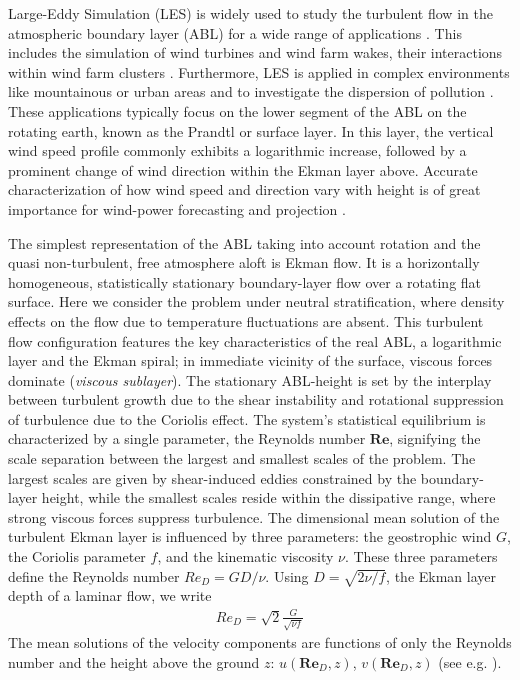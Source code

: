 \documentclass[smallcondensed,draft]{svjour3}
\newcommand{\RE}{\mathbf{Re}}
\begin{document}
Large-Eddy Simulation (LES) is widely used to study the turbulent flow in the atmospheric boundary layer (ABL) for a wide range of applications \citep{stoll2020large}. This includes the simulation of wind turbines and wind farm wakes, their interactions within wind farm clusters \citep{porte2011large,mehta2014large,breton2017survey}. Furthermore, LES is applied in complex environments like mountainous or urban areas \citep{stoll2020large,garcia2018predictive} and to investigate the dispersion of pollution \citep{han2018large}. These applications typically focus on the lower segment of the ABL on the rotating earth, known as the Prandtl or surface layer. In this layer, the vertical wind speed profile commonly exhibits a logarithmic increase, followed by a prominent change of wind direction within the Ekman layer above. Accurate characterization of how wind speed and direction vary with height is of great importance for wind-power forecasting and projection \citep{optis2014moving}.

The simplest representation of the ABL taking into account rotation and the quasi non-turbulent, free atmosphere aloft is Ekman flow. It is a horizontally homogeneous, statistically stationary boundary-layer flow over a rotating flat surface. Here we consider the problem under neutral stratification, where density effects on the flow due to temperature fluctuations are absent. This turbulent flow configuration features the key characteristics of the real ABL, a logarithmic layer and the Ekman spiral; in immediate vicinity of the surface, viscous forces dominate (\emph{viscous sublayer}). The stationary ABL-height is set by the interplay between turbulent growth due to the shear instability \citep{lilly1966instability} and rotational suppression of turbulence due to the Coriolis effect. The system's statistical equilibrium is characterized by a single parameter, the Reynolds number $\RE$, signifying the scale separation between the largest and smallest scales of the problem. The largest scales are given by shear-induced eddies constrained by the boundary-layer height, while the smallest scales reside within the dissipative range, where strong viscous forces suppress turbulence. The dimensional mean solution of the turbulent Ekman layer is influenced by three parameters: the geostrophic wind $G$, the Coriolis parameter $f$, and the kinematic viscosity $\nu$. These three parameters define the Reynolds number $Re_D = GD/\nu$. Using $D=\sqrt{2\nu/f}$, the Ekman layer depth of a laminar flow, we write
%
\begin{align}\label{red}
 Re_D = \sqrt{2}\frac{G}{\sqrt{\nu f}}
\end{align}
%
The mean solutions of the velocity components are functions of only the Reynolds number and the height above the ground $z$: $u(\RE_D,z)$, $v(\RE_D,z)$ (see e.g. \cite{csanady1967resistance}).
\end{document}

